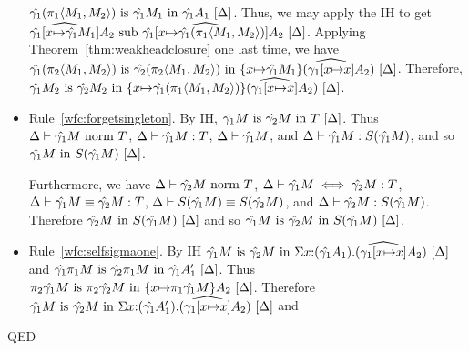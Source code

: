 \documentclass{article}
\theoremstyle{break}
\newcommand{\qed}{\mbox{QED}}
\newcommand{\env}{\gamma}
\newcommand{\envone}{\hat{\env_1}}
\newcommand{\envtwo}{\hat{\env_2}}
\newcommand{\envonex}{\widehat{\env_1[\cvar{\mapsto}\cvar]}}
\newenvironment{proof}{\noindent{\bf Proof:}\hspace*{0.5em}}{\hspace*{\fill}\qed}
\begin{document}
\begin{proof}
\begin{itemize}
$\semanticequivterm{\world}{\envone(\cpi{1}{\cpair{\constructor_1}{\constructor_2}})}
   {\envone\constructor_1}{\envone\kind_1}$.
Thus, we may apply the IH to get
$\semanticsubtype{\world}{\widehat{\envone[\cvar{\mapsto}\envone\constructor_1]}\kind_2}
    {\widehat{\envone[\cvar{\mapsto}\envone(\cpi{1}{\cpair{\constructor_1}{\constructor_2}})]}\kind_2}$.
Applying Theorem~\ref{thm:weakheadclosure} one last time, we have
$\semanticequivterm{\world}{\envone(\cpi{2}{\cpair{\constructor_1}{\constructor_2}})}
   {\envtwo(\cpi{2}{\cpair{\constructor_1}{\constructor_2}})}
   {\substitute{\cvar}{\envone\constructor_1}{(\envonex\kind_2)}}$.
Therefore,
$\semanticequivterm{\world}{\envone\constructor_2}{\envtwo\constructor_2}
  {\substitute{\cvar}{\envone(\cpi{1}{\cpair{\constructor_1}{\constructor_2}})}{(\envonex\kind_2)}}$.

\item Rule~\ref{wfc:forgetsingleton}.
By IH, $\semanticequivterm{\world}{\envone\constructor}{\envtwo\constructor}{\ktype}$.
Thus $\normterm{\world}{\envone\constructor}{\ktype}$, 
$\validconstructor{\world}{\envone\constructor}{\ktype}$, 
$\validkind{\world}{\envone\constructor}$, and
$\validconstructor{\world}{\envone\constructor}{\ksingleton{\envone\constructor}}$,
and so
$\semanticvalidterm{\world}{\envone\constructor}{\ksingleton{\envone\constructor}}$.

Furthermore, we have $\normterm{\world}{\envtwo\constructor}{\ktype}$,
$\aconequiv{\world}{\envone\constructor}{\envtwo\constructor}{\ktype}$,
$\equivconstructor{\world}{\envone\constructor}{\envtwo\constructor}{\ktype}$,
$\equivkind{\world}{\ksingleton{\envone\constructor}}{\ksingleton{\envtwo\constructor}}$, and
$\validconstructor{\world}{\envtwo\constructor}{\ksingleton{\envone\constructor}}$.
Therefore $\semanticvalidterm{\world}{\envtwo\constructor}{\ksingleton{\envone\constructor}}$ and
so $\semanticequivterm{\world}{\envone\constructor}{\envtwo\constructor}{\ksingleton{\envone\constructor}}$.

\item Rule~\ref{wfc:selfsigmaone}.
By IH
$\semanticequivterm{\world}{\envone\constructor}{\envtwo\constructor}
   {\ksigma{\cvar}{(\envone\kind_1)}{(\envonex{\kind_2})}}$ and
$\semanticequivterm{\world}{\envone{\cpi{1}{\constructor}}}{\envtwo{\cpi{1}{\constructor}}}
   {\envone\kind'_1}$.
Thus 
$\semanticequivterm{\world}{\cpi{2}{\envone\constructor}}{\cpi{2}{\envtwo\constructor}}
   {\substitute{\cvar}{\cpi{1}{\envone\constructor}}{\kind_2}}$.
Therefore
$\semanticequivterm{\world}{\envone\constructor}{\envtwo\constructor}
   {\ksigma{\cvar}{(\envone\kind'_1)}{(\envonex{\kind_2})}}$ and


\end{itemize}
\end{proof}
\end{document}
